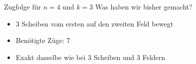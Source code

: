 \begin{frame}{Zugfolge für $n=4$ und $k=3$}
    Was haben wir bisher gemacht?
    \begin{itemize}
        \item 3 Scheiben vom ersten auf den zweiten Feld bewegt
        \item Benötigte Züge: 7
        \item Exakt dasselbe wie bei 3 Scheiben und 3 Feldern
    \end{itemize}
\end{frame}